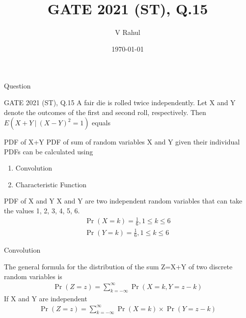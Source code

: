\documentclass{beamer}
\title{GATE 2021 (ST), Q.15}
\author{V Rahul}
\institute{IITH}
\date{\today}
\providecommand{\brak}[1]{\ensuremath{\left(#1\right)}}
\begin{document}
\begin{frame}
  \titlepage
\end{frame}

\begin{frame}{Question}
    \begin{block}{GATE 2021 (ST), Q.15}
        A fair die is rolled twice independently. Let X and Y denote the outcomes of the first and second roll, respectively. Then $E(X+Y\:|\:(X-Y)^2=1)$ equals
    \end{block}
\end{frame}

\begin{frame}{PDF of X+Y}
    PDF of sum of random variables X and Y given their individual PDFs can be calculated using
    \begin{enumerate}
        \item Convolution
        \item Characteristic Function
    \end{enumerate}
\end{frame}

\begin{frame}{PDF of X and Y}
    X and Y are two independent random variables that can take the values 1, 2, 3, 4, 5, 6.
    \begin{align}
        \Pr\brak{X=k}=\frac{1}{6}, 1\leq k \leq 6\\
        \Pr\brak{Y=k}=\frac{1}{6}, 1\leq k \leq 6
    \end{align}
\end{frame}

\begin{frame}{Convolution}
    \begin{block}{}
        The general formula for the distribution of the sum Z=X+Y of two discrete random variables is\\
        \begin{align}
            \Pr\brak{Z=z} = \sum_{k=-\infty}^{\infty} \Pr\brak{X=k,Y=z-k}
        \end{align}
        If X and Y are independent\\
        \begin{align}
            \Pr\brak{Z=z} = \sum_{k=-\infty}^{\infty} \Pr\brak{X=k}\times\Pr\brak{Y=z-k}
        \end{align}
    \end{block}
\end{frame}
\end{document}
